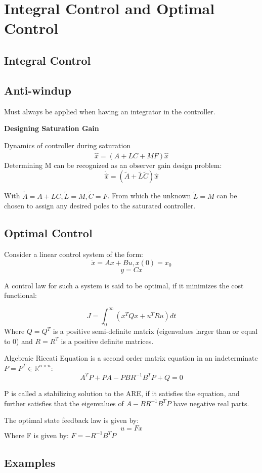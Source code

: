 \section{Integral Control and Optimal Control}

\subsection{Integral Control}
\subsection{Anti-windup}
Must always be applied when having an integrator in the controller.

\textbf {Designing Saturation Gain}

Dynamics of controller during saturation
$$ \dot{\hat{x}} = (A+LC+MF)\hat{x}$$
Determining M can be recognized as an observer gain design problem:
$$ \dot{\hat{x}} = (\tilde{A}+\tilde{L}\tilde{C}) \hat{x}$$

With $\tilde{A}=A+LC, \tilde{L}=M, \tilde{C}=F$. From which the unknown $\tilde{L}=M$ can be chosen to assign
any desired poles to the saturated controller.

\subsection{Optimal Control}

Consider a linear control system of the form:
$$ \dot{x} = Ax + Bu, x(0)=x_0 $$
$$ y = Cx $$

A control law for such a system is said to be optimal, if it minimizes the cost functional:

$$ J = \int_{0}^{\infty} (x^TQx + u^TRu) dt $$
Where $Q=Q^T$ is a positive semi-definite matrix (eigenvalues larger than or equal to 0) and $R=R^T$ is a positive definite matrices.

Algebraic Riccati Equation is a second order matrix equation in an indeterminate $P=P^T \in \mathbb{R}^{n \times n}$:
$$ A^TP + PA - PBR^{-1}B^TP + Q = 0 $$

P is called a stabilizing solution to the ARE, if it satisfies the equation, and further satisfies that the eigenvalues of
$A-BR^{-1}B^TP$ have negative real parts.

The optimal state feedback law is given by:
$$u = Fx$$
Where F is given by:
$F = -R^{-1}B^TP$


\subsection{Examples}
